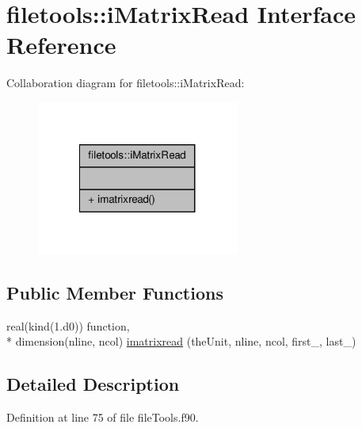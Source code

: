 \hypertarget{interfacefiletools_1_1i_matrix_read}{\section{filetools\-:\-:i\-Matrix\-Read Interface Reference}
\label{interfacefiletools_1_1i_matrix_read}
}


Collaboration diagram for filetools\-:\-:i\-Matrix\-Read\-:\nopagebreak
\begin{figure}[H]
\begin{center}
\leavevmode
\includegraphics[width=188pt]{interfacefiletools_1_1i_matrix_read__coll__graph}
\end{center}
\end{figure}
\subsection*{Public Member Functions}
\begin{DoxyCompactItemize}
\item 
real(kind(1.d0)) function, \\*
dimension(nline, ncol) \hyperlink{interfacefiletools_1_1i_matrix_read_abcb8aa52da9f4ed587de95575cdc2114}{imatrixread} (the\-Unit, nline, ncol, first\-\_\-, last\-\_\-)
\end{DoxyCompactItemize}


\subsection{Detailed Description}


Definition at line 75 of file file\-Tools.\-f90.



